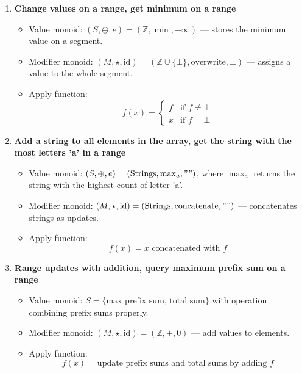 \documentclass{article}
\begin{document}
\begin{enumerate}
    \item \textbf{Change values on a range, get minimum on a range} \\
    \begin{itemize}
        \item Value monoid: \( (S, \oplus, e) = (\mathbb{Z}, \min, +\infty) \) — stores the minimum value on a segment.
        \item Modifier monoid: \( (M, \star, \mathrm{id}) = (\mathbb{Z} \cup \{\bot\}, \text{overwrite}, \bot) \) — assigns a value to the whole segment.
        \item Apply function: 
        \[
            f(x) = \begin{cases}
            f & \text{if } f \neq \bot \\
            x & \text{if } f = \bot
            \end{cases}
        \]
    \end{itemize}

    \item \textbf{Add a string to all elements in the array, get the string with the most letters 'a' in a range} \\
    \begin{itemize}
        \item Value monoid: \( (S, \oplus, e) = (\text{Strings}, \max_a, "") \), where \(\max_a\) returns the string with the highest count of letter 'a'.
        \item Modifier monoid: \( (M, \star, \mathrm{id}) = (\text{Strings}, \text{concatenate}, "") \) — concatenates strings as updates.
        \item Apply function: 
        \[
            f(x) = x \text{ concatenated with } f
        \]
    \end{itemize}

    \item \textbf{Range updates with addition, query maximum prefix sum on a range} \\
    \begin{itemize}
        \item Value monoid: \( S = \{ \text{max prefix sum, total sum} \} \) with operation combining prefix sums properly.
        \item Modifier monoid: \( (M, \star, \mathrm{id}) = (\mathbb{Z}, +, 0) \) — add values to elements.
        \item Apply function: 
        \[
            f(x) = \text{update prefix sums and total sums by adding } f
        \]
    \end{itemize}
\end{enumerate}
\end{document}
